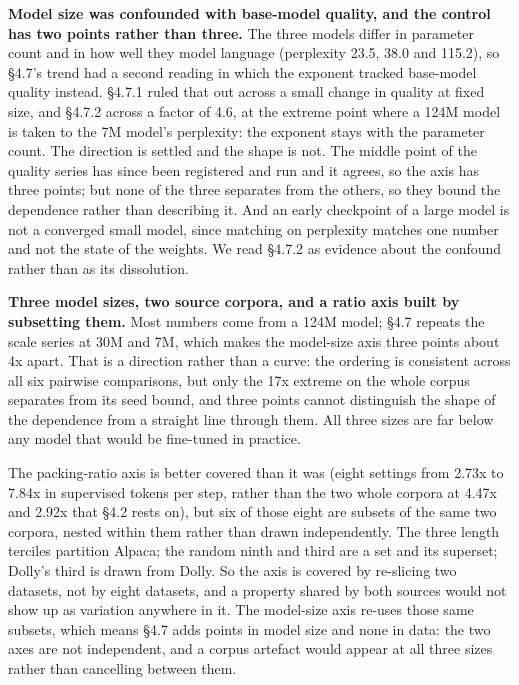 \documentclass[11pt]{article}
\begin{document}
\textbf{Model size was confounded with base-model quality, and the control has two points rather than three.} The three models differ in parameter count and in how well they model language (perplexity 23.5, 38.0 and 115.2), so \S{}4.7's trend had a second reading in which the exponent tracked base-model quality instead. \S{}4.7.1 ruled that out across a small change in quality at fixed size, and \S{}4.7.2 across a factor of 4.6, at the extreme point where a 124M model is taken to the 7M model's perplexity: the exponent stays with the parameter count. The direction is settled and the shape is not. The middle point of the quality series has since been registered and run and it agrees, so the axis has three points; but none of the three separates from the others, so they bound the dependence rather than describing it. And an early checkpoint of a large model is not a converged small model, since matching on perplexity matches one number and not the state of the weights. We read \S{}4.7.2 as evidence about the confound rather than as its dissolution.

\textbf{Three model sizes, two source corpora, and a ratio axis built by subsetting them.} Most numbers come from a 124M model; \S{}4.7 repeats the scale series at 30M and 7M, which makes the model-size axis three points about 4x apart. That is a direction rather than a curve: the ordering is consistent across all six pairwise comparisons, but only the 17x extreme on the whole corpus separates from its seed bound, and three points cannot distinguish the shape of the dependence from a straight line through them. All three sizes are far below any model that would be fine-tuned in practice.

The packing-ratio axis is better covered than it was (eight settings from 2.73x to 7.84x in supervised tokens per step, rather than the two whole corpora at 4.47x and 2.92x that \S{}4.2 rests on), but six of those eight are subsets of the same two corpora, nested within them rather than drawn independently. The three length terciles partition Alpaca; the random ninth and third are a set and its superset; Dolly's third is drawn from Dolly. So the axis is covered by re-slicing two datasets, not by eight datasets, and a property shared by both sources would not show up as variation anywhere in it. The model-size axis re-uses those same subsets, which means \S{}4.7 adds points in model size and none in data: the two axes are not independent, and a corpus artefact would appear at all three sizes rather than cancelling between them.
\end{document}
